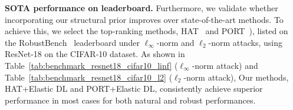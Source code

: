 















\textbf{SOTA performance on leaderboard.} 
Furthermore, we validate whether incorporating our structural prior improves over state-of-the-art methods. To achieve this, we select the top-ranking methods, HAT~\cite{rade2022reducing} and PORT~\cite{sehwag2021robust}), listed on the RobustBench~\cite{croce2020robustbench} leaderboard under $\ell_\infty$-norm and $\ell_2$-norm attacks, using ResNet-18 on the CIFAR-10 dataset. As shown in Table~\ref{tab:benchmark_resnet18_cifar10_linf} ($\ell_\infty$-norm attack) and Table~\ref{tab:benchmark_resnet18_cifar10_l2} ($\ell_2$-norm attack), 
Our methods, HAT+Elastic DL and PORT+Elastic DL, consistently achieve superior performance in most cases for both natural and robust performances.




